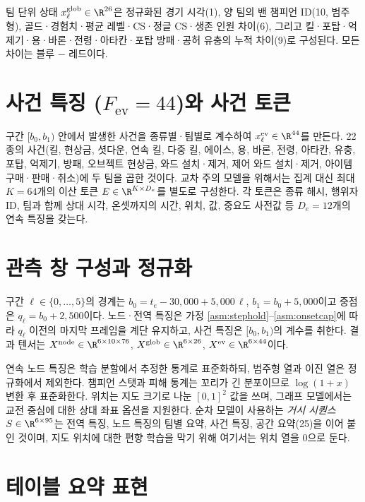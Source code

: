 팀 단위 상태 $x^{\mathrm{glob}}_\ell \in \R^{26}$은 정규화된 경기 시각(1), 양 팀의 밴 챔피언 ID(10, 범주형), 골드·경험치·평균 레벨·CS·정글 CS·생존 인원 차이(6), 그리고 킬·포탑·억제기·용·바론·전령·아타칸·포탑 방패·공허 유충의 누적 차이(9)로 구성된다. 모든 차이는 블루 $-$ 레드이다.

\section{사건 특징 ($F_{\mathrm{ev}} = 44$)와 사건 토큰}
\label{sec:feat-event}

구간 $[b_0, b_1)$ 안에서 발생한 사건을 종류별·팀별로 계수하여 $x^{\mathrm{ev}}_\ell \in \R^{44}$를 만든다. 22 종의 사건(킬, 현상금, 셧다운, 연속 킬, 다중 킬, 에이스, 용, 바론, 전령, 아타칸, 유충, 포탑, 억제기, 방패, 오브젝트 현상금, 와드 설치·제거, 제어 와드 설치·제거, 아이템 구매·판매·취소)에 두 팀을 곱한 것이다. 교차 주의 모델을 위해서는 집계 대신 최대 $K = 64$개의 이산 토큰 $E \in \R^{K \times D_e}$를 별도로 구성한다. 각 토큰은 종류 해시, 행위자 ID, 팀과 함께 상대 시각, 온셋까지의 시간, 위치, 값, 중요도 사전값 등 $D_e = 12$개의 연속 특징을 갖는다.

\section{관측 창 구성과 정규화}
\label{sec:feat-window}

구간 $\ell \in \{0, \dots, 5\}$의 경계는 $b_0 = t_e - 30{,}000 + 5{,}000\,\ell$, $b_1 = b_0 + 5{,}000$이고 중점은 $q_\ell = b_0 + 2{,}500$이다. 노드·전역 특징은 가정 \ref{asm:stephold}--\ref{asm:onsetcap}에 따라 $q_\ell$ 이전의 마지막 프레임을 계단 유지하고, 사건 특징은 $[b_0, b_1)$의 계수를 취한다. 결과 텐서는 $X^{\mathrm{node}} \in \R^{6\times 10\times 76}$, $X^{\mathrm{glob}} \in \R^{6\times 26}$, $X^{\mathrm{ev}} \in \R^{6\times 44}$이다.

연속 노드 특징은 학습 분할에서 추정한 통계로 표준화하되, 범주형 열과 이진 열은 정규화에서 제외한다. 챔피언 스탯과 피해 통계는 꼬리가 긴 분포이므로 $\log(1 + x)$ 변환 후 표준화한다. 위치는 지도 크기로 나눈 $[0,1]^2$ 값을 쓰며, 그래프 모델에서는 교전 중심에 대한 상대 좌표 옵션을 지원한다. 순차 모델이 사용하는 \emph{거시 시퀀스} $S \in \R^{6 \times 95}$는 전역 특징, 노드 특징의 팀별 요약, 사건 특징, 공간 요약(25)을 이어 붙인 것이며, 지도 위치에 대한 편향 학습을 막기 위해 여기서는 위치 열을 0으로 둔다.

\section{테이블 요약 표현}
\label{sec:feat-tabular}

